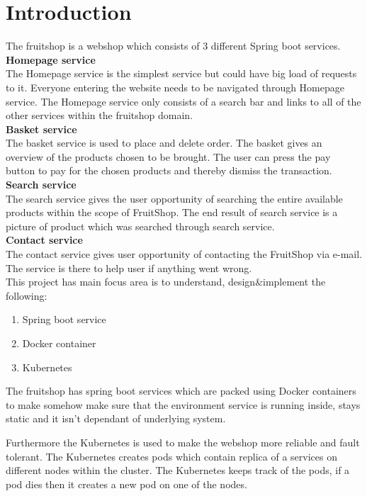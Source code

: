 \chapter{Introduction}\label{ch:introduction}

The fruitshop is a webshop which consists of 3 different Spring boot services.\\ 


\textbf{Homepage service}\\
The Homepage service is the simplest service but could have big load of requests to it. Everyone entering the website needs to be navigated through Homepage service. 
The Homepage service only consists of a search bar and links to all of the other services within the fruitshop domain.\\ 

\textbf{Basket service }\\
The basket service is used to place and delete order. The basket gives an overview of the products chosen to be brought. The user can press the pay button to pay for the chosen products and thereby dismiss the transaction.\\ 

\textbf{Search service }\\
The search service gives the user opportunity of searching the entire available products within the scope of FruitShop. The end result of search service is a picture of product which was searched through search service.\\   

\textbf{Contact service}\\
The contact service gives user opportunity of contacting the FruitShop via e-mail. The service is there to help user if anything went wrong.\\


This project has main focus area is to understand, design&implement the following:  

\begin{enumerate}
	\item Spring boot service
	\item Docker container
	\item Kubernetes
\end{enumerate}

The fruitshop has spring boot services which are packed using Docker containers to make somehow make sure that the environment service is running inside, stays static and it isn't dependant of underlying system. 

Furthermore the Kubernetes is used to make the webshop more reliable and fault tolerant. The Kubernetes creates pods which contain replica of a services on different nodes within the cluster. The Kubernetes keeps track of the pods, if a pod dies then it creates a new pod on one of the nodes. 




